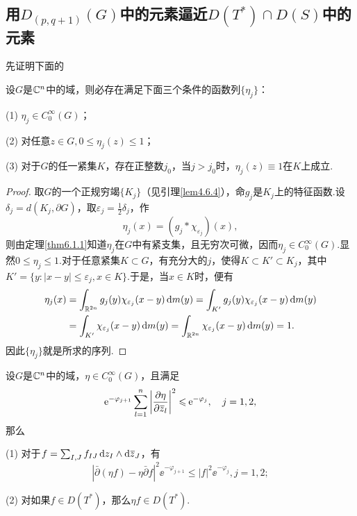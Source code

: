 \subsection{用$D_{(p,q+1)}(G)$中的元素逼近$D(T^\ast)\cap D(S)$中的元素}
先证明下面的
\begin{lemma}\label{lem6.3.1}
	设$G$是$\mathbb C^n$中的域，则必存在满足下面三个条件的函数列$\{\eta_j\}$：
	
	(1)\hypertarget{6.3.1}{}
	$\eta_j\in C_0^\infty(G)$；
	
	(2)\hypertarget{6.3.1}{}
	对任意$z\in G,0\le\eta_j(z)\le1$；
	
	(3)\hypertarget{6.3.1}{}
	对于$G$的任一紧集$K$，存在正整数$j_0$，当$j>j_0$时，$\eta_j(z)\equiv1$在$K$上成立.
\end{lemma}
\begin{proof}
	取$G$的一个正规穷竭$\{K_j\}$（见引理\ref{lem4.6.4}），命$g_j$是$K_j$上的特征函数.设$\delta_j=d(K_j,\partial G)$，取$\varepsilon_j=\frac12\delta_j$，作
	\[\eta_j(x)=(g_j\ast\chi_{\varepsilon_j})(x),\]
	则由定理\ref{thm6.1.1}知道$\eta_j$在$G$中有紧支集，且无穷次可微，因而$\eta_j\in C_0^\infty(G)$.显然$0\le \eta_j\le1$.对于任意紧集$K\subset G$，有充分大的$j$，使得$K\subset K'\subset K_j$，其中$K'=\{y\colon |x-y|\le\varepsilon_j,x\in K\}$.于是，当$x\in K$时，便有
	\begin{align*}
		\eta_j(x)
		&=\int_{\mathbb R^{2n}}g_j(y)\chi_{\varepsilon_j}(x-y)\mathop{}\!\mathrm{d} m(y)=\int_{K'}g_j(y)\chi_{\varepsilon_j}(x-y)\mathop{}\!\mathrm{d} m(y)\\
		&=\int_{K'}\chi_{\varepsilon_j}(x-y)\mathop{}\!\mathrm{d} m(y)=\int_{\mathbb R^{2n}}\chi_{\varepsilon_j}(x-y)\mathop{}\!\mathrm{d} m(y)=1.
	\end{align*}
因此$\{\eta_j\}$就是所求的序列.
\end{proof}
\begin{lemma}\label{lem6.3.2}
	设$G$是$\mathbb C^n$中的域，$\eta\in C_0^\infty(G)$，且满足
	\begin{equation}\label{eq6.3.2}
		\operatorname{\!\!\;\mathrm e}^{-\varphi_{j+1}}\sum_{l=1}^{n}\left|\frac{\partial \eta}{\partial {}\mkern1mu\overline{\mkern-1muz}_l}\right|^2\leqslant\operatorname{\!\!\;\mathrm e}^{-\varphi_j},\quad j=1,2,
	\end{equation}
那么

(1)\hypertarget{6.3.2}{}
对于$f=\sum_{I,J}f_{IJ}\mathop{}\!\mathrm dz_I\wedge\mathop{}\!\mathrm d{}\mkern1mu\overline{\mkern-1muz}_J$，有
\begin{equation}\label{eq6.3.3}
	\left|\bar{\partial}(\eta f)-\eta\bar{\partial}f\right|^2\ee^{-\varphi_{j+1}}\le|f|^2\ee^{-\varphi_j},j=1,2;
\end{equation}

(2)\hypertarget{6.3.2}{}
对如果$f\in D(T^\ast)$，那么$\eta f\in D(T^\ast)$.
\end{lemma}
